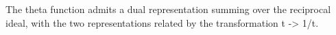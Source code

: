 The theta function admits a dual representation summing over the reciprocal ideal, with the two representations related by the transformation t -> 1/t.
